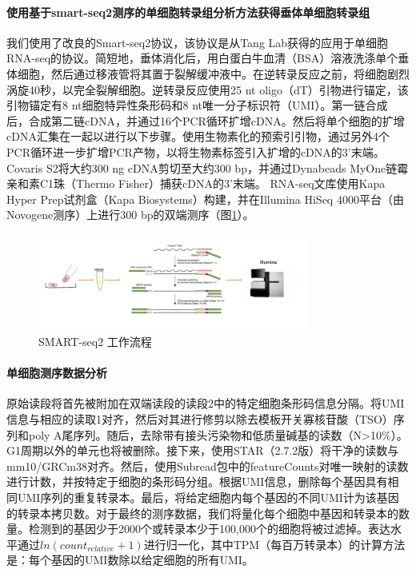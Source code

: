 \paragraph{使用基于smart-seq2测序的单细胞转录组分析方法获得垂体单细胞转录组}
  我们使用了改良的Smart-seq2协议，该协议是从Tang Lab获得的应用于单细胞RNA-seq的协议。简短地，垂体消化后，用白蛋白牛血清（BSA）溶液洗涤单个垂体细胞，然后通过移液管将其置于裂解缓冲液中。在逆转录反应之前，将细胞剧烈涡旋40秒，以完全裂解细胞。逆转录反应使用25 nt oligo（dT）引物进行锚定，该引物锚定有8 nt细胞特异性条形码和8 nt唯一分子标识符（UMI）。第一链合成后，合成第二链cDNA，并通过16个PCR循环扩增cDNA。然后将单个细胞的扩增cDNA汇集在一起​​以进行以下步骤。使用生物素化的预索引引物，通过另外4个PCR循环进一步扩增PCR产物，以将生物素标签引入扩增的cDNA的3'末端。 Covaris S2将大约300 ng cDNA剪切至大约300 bp，并通过Dynabeads MyOne链霉亲和素C1珠（Thermo Fisher）捕获cDNA的3'末端。 RNA-seq文库使用Kapa Hyper Prep试剂盒（Kapa Biosystems）构建，并在Illumina HiSeq 4000平台（由Novogene测序）上进行300 bp的双端测序（图\ref{fig:scseq-smart}）。
\begin{figure}[!htb]
  \centering
  \includegraphics[width=0.8\textwidth]{figs/scseq-smart.png}
  \caption{SMART-seq2 工作流程}
  \label{fig:scseq-smart}
\end{figure}
\paragraph{单细胞测序数据分析}
  原始读段将首先被附加在双端读段的读段2中的特定细胞条形码信息分隔。将UMI信息与相应的读取1对齐，然后对其进行修剪以除去模板开关寡核苷酸（TSO）序列和poly A尾序列。随后，去除带有接头污染物和低质量碱基的读数（N>10\%）。 G1周期以外的单元也将被删除。接下来，使用STAR（2.7.2版）将干净的读数与mm10/GRCm38对齐。然后，使用Subread包中的featureCounts对唯一映射的读数进行计数，并按特定于细胞的条形码分组。根据UMI信息，删除每个基因具有相同UMI序列的重复转录本。最后，将给定细胞内每个基因的不同UMI计为该基因的转录本拷贝数。对于最终的测序数据，我们将量化每个细胞中基因和转录本的数量。检测到的基因少于2000个或转录本少于100,000个的细胞将被过滤掉。表达水平通过$ln(count_{relative}+1)$进行归一化，其中TPM（每百万转录本）的计算方法是：每个基因的UMI数除以给定细胞的所有UMI。


